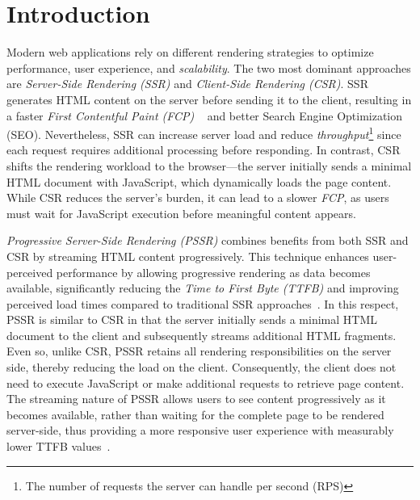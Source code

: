 \section{Introduction}


Modern web applications rely on different rendering strategies to optimize
performance, user experience, and \textit{scalability}. The two most dominant
approaches are \textit{Server-Side Rendering (SSR)} and \textit{Client-Side
    Rendering (CSR)}. SSR generates HTML content on the server before sending it to
the client, resulting in a faster \textit{First Contentful Paint (FCP)}
~\cite{Edgar2024-FCP} and better Search Engine Optimization (SEO). Nevertheless, SSR
can increase server load and reduce \textit{throughput}\footnote{The number of
    requests the server can handle per second (RPS)} since each request requires
additional processing before responding. In contrast, CSR shifts the rendering
workload to the browser—the server initially sends a minimal HTML document with
JavaScript, which dynamically loads the page content. While CSR reduces the
server’s burden, it can lead to a slower \textit{FCP}, as users must wait for
JavaScript execution before meaningful content appears.

\textit{Progressive Server-Side Rendering (PSSR)} combines benefits from both SSR and CSR
by streaming HTML content progressively. This technique enhances user-perceived performance by
allowing progressive rendering as data becomes available, significantly reducing the
\textit{Time to First Byte (TTFB)} and improving perceived load times compared to traditional
SSR approaches~\cite{wise2024pssr}. In this respect,
PSSR is similar to CSR in that the server initially sends a minimal HTML
document to the client and subsequently streams additional HTML fragments.
Even so, unlike CSR, PSSR retains all rendering responsibilities on the server side,
thereby reducing the load on the client. Consequently, the client does
not need to execute JavaScript or make additional requests to retrieve page content.
The streaming nature of PSSR allows users to see content progressively as it becomes
available, rather than waiting for the complete page to be rendered server-side,
thus providing a more responsive user experience with measurably lower TTFB values~\cite{wise2024pssr}.

